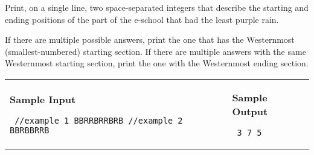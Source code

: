 \documentclass[11pt]{article}
\begin{document}
Print, on a single line, two space-separated integers that describe
the starting and ending positions of the part of the e-school that had
the least purple rain.

If there are multiple possible answers, print the one that has the
Westernmost (smallest-numbered) starting section.  If there are multiple
answers with the same Westernmost starting section, print the one with
the Westernmost ending section.


\vspace{0.25in}\hspace{-0.3in}\begin{tabular}{ll}

\parbox{3in}{{\large\bf Sample Input}

\vspace{0.15in}

{\tt 
//example 1\linebreak
BBRRBRRBRB\linebreak
\linebreak
//example 2\linebreak
BBRBBRRB
}
}

&

\parbox{3in}{{\large\bf Sample Output}

\vspace{0.15in}

{\tt
3 7\linebreak
{} 5
}


}

\\
\end{tabular}
\end{document}
